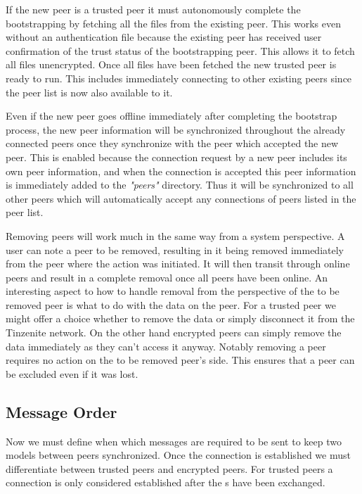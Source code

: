 If the new peer is a trusted peer it must autonomously complete the bootstrapping by fetching all the files from the existing peer.
This works even without an authentication file because the existing peer has received user confirmation of the trust status of the bootstrapping peer.
This allows it to fetch all files unencrypted.
Once all files have been fetched the new trusted peer is ready to run.
This includes immediately connecting to other existing peers since the peer list is now also available to it.

Even if the new peer goes offline immediately after completing the bootstrap process, the new peer information will be synchronized throughout the already connected peers once they synchronize with the peer which accepted the new peer.
This is enabled because the connection request by a new peer includes its own peer information, and when the connection is accepted this peer information is immediately added to the \textit{"peers"} directory.
Thus it will be synchronized to all other peers which will automatically accept any connections of peers listed in the peer list.

Removing peers will work much in the same way from a system perspective.
A user can note a peer to be removed, resulting in it being removed immediately from the peer where the action was initiated.
It will then transit through online peers and result in a complete removal once all peers have been online.
An interesting aspect to how to handle removal from the perspective of the to be removed peer is what to do with the data on the peer.
For a trusted peer we might offer a choice whether to remove the data or simply disconnect it from the Tinzenite network.
On the other hand encrypted peers can simply remove the data immediately as they can't access it anyway.
Notably removing a peer requires no action on the to be removed peer's side.
This ensures that a peer can be excluded even if it was lost.

\subsection{Message Order}
\label{sub:Message Order}

Now we must define when which messages are required to be sent to keep two models between peers synchronized.
Once the connection is established we must differentiate between trusted peers and encrypted peers.
For trusted peers a connection is only considered established after the s have been exchanged.

